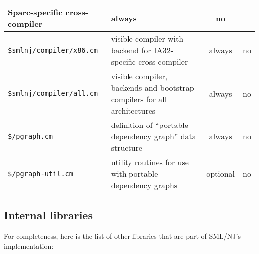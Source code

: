 \begin{small}
\begin{center}
\begin{tabular}{p{2.3in}||p{2.9in}|c|c}
Sparc-specific cross-compiler & always & no \\
\hline
{\tt \$smlnj/compiler/x86.cm} & visible compiler with backend for
IA32-specific cross-compiler & always & no \\
\hline
{\tt \$smlnj/compiler/all.cm} & visible compiler, backends and
bootstrap compilers for all architectures & always & no \\
\hline
{\tt \$/pgraph.cm} & definition of ``portable dependency graph'' data
structure & always & no \\
\hline
{\tt \$/pgraph-util.cm} & utility routines for use with portable
dependency graphs & optional & no
\end{tabular}
\end{center}
\end{small}

\subsection{Internal libraries}

For completeness, here is the list of other libraries that are part of
SML/NJ's implementation:

